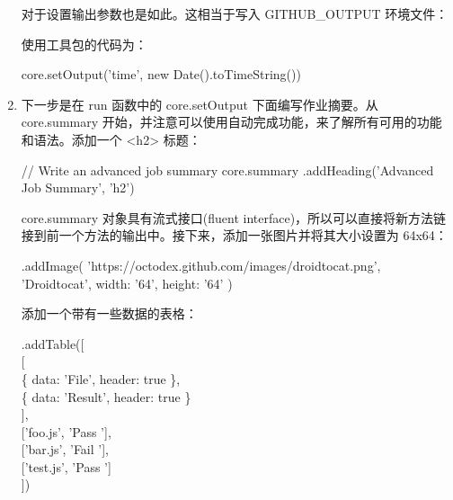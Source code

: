 \begin{enumerate}
对于设置输出参数也是如此。这相当于写入 GITHUB\_OUTPUT 环境文件：


使用工具包的代码为：

\begin{shell}
core.setOutput('time', new Date().toTimeString())
\end{shell}

\item 
下一步是在 run 函数中的 core.setOutput 下面编写作业摘要。从 core.summary 开始，并注意可以使用自动完成功能，来了解所有可用的功能和语法。添加一个 <h2> 标题：

\begin{shell}
// Write an advanced job summary
core.summary
  .addHeading('Advanced Job Summary', 'h2')
\end{shell}

core.summary 对象具有流式接口(fluent interface)，所以可以直接将新方法链接到前一个方法的输出中。接下来，添加一张图片并将其大小设置为 64x64：

\begin{shell}
.addImage(
  'https://octodex.github.com/images/droidtocat.png',
  'Droidtocat',
    {
    width: '64',
    height: '64'
    }
  )
\end{shell}

添加一个带有一些数据的表格：

\begin{tcolorbox}[ breakable,colback = bashcodebg, colframe= black!50!white]
\scriptsize{
.addTable([ \\
\hspace*{1em}[ \\
\hspace*{2em}\{ data: 'File', header: true \}, \\
\hspace*{2em}\{ data: 'Result', header: true \} \\
\hspace*{1em}], \\
\hspace*{1em}['foo.js', 'Pass '], \\
\hspace*{1em}['bar.js', 'Fail '], \\
\hspace*{1em}['test.js', 'Pass '] \\
])
}
\end{tcolorbox}


\end{enumerate}
